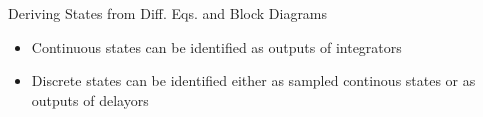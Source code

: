 \begin{frame}
Deriving States from Diff. Eqs. and Block Diagrams
 \begin{itemize}
 \item Continuous states can be identified as outputs of integrators
 \item Discrete states can be identified either as sampled continous states or as outputs of delayors
\end{itemize}
\end{frame}
